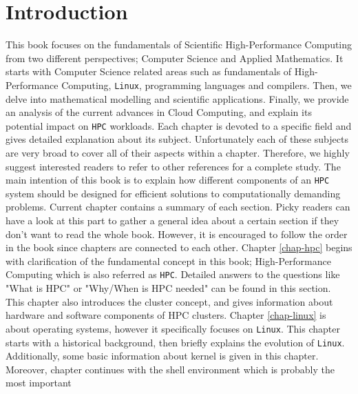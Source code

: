 \chapter{Introduction} \label{chap-introduction}
This book focuses on the fundamentals of Scientific High-Performance Computing from two different 
perspectives; Computer Science and Applied Mathematics. It starts with Computer Science related 
areas such as fundamentals of High-Performance Computing, \texttt{Linux}, programming languages 
and compilers. Then, we delve into mathematical modelling and scientific applications. Finally, 
we provide an analysis of the current advances in Cloud Computing, and explain its potential 
impact on \texttt{HPC} workloads.
\newline \newline 
Each chapter is devoted to a specific field and gives detailed explanation about its subject.
Unfortunately each of these subjects are very broad to cover all of their aspects within a
chapter. Therefore, we highly suggest interested readers to refer to other references for a 
complete study. The main intention of this book is to explain how different components of an 
\texttt{HPC} system should be designed for efficient solutions to computationally demanding 
problems.
\newline \newline 
Current chapter contains a summary of each section. Picky readers can have a look at this part to
gather a general idea about a certain section if they don't want to read the whole book. However,
it is encouraged to follow the order in the book since chapters are connected to each other.
\newline \newline 
Chapter \ref{chap-hpc} begins with clarification of the fundamental concept in this book; 
High-Performance Computing which is also referred as \texttt{HPC}. Detailed answers to the
questions like "What is HPC" or "Why/When is HPC needed" can be found in this section. This
chapter also introduces the cluster concept, and gives information about hardware and software
components of HPC clusters.  
\newline \newline 
Chapter \ref{chap-linux} is about operating systems, however it specifically focuses on 
\texttt{Linux}. This chapter starts with a historical background, then briefly explains the 
evolution of \texttt{Linux}. Additionally, some basic information about kernel is given in this 
chapter. Moreover, chapter continues with the shell environment which is probably the most important 
